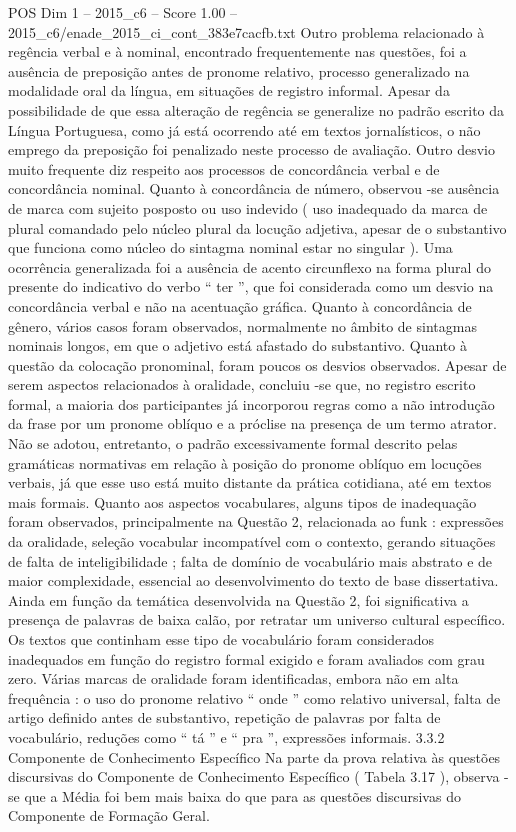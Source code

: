 \begin{textsample}{POS Dim 1 – 2015\_c6 – Score 1.00 – 2015\_c6/enade\_2015\_ci\_cont\_383e7cacfb.txt}
Outro problema relacionado à regência verbal e à nominal, encontrado frequentemente nas questões, foi a ausência de preposição antes de pronome relativo, processo generalizado na modalidade oral da língua, em situações de registro informal.
Apesar da possibilidade de que essa alteração de regência se generalize no padrão escrito da Língua Portuguesa, como já está ocorrendo até em textos jornalísticos, o não emprego da preposição foi penalizado neste processo de avaliação.
Outro desvio muito frequente diz respeito aos processos de concordância verbal e de concordância nominal.
Quanto à concordância de número, observou -se ausência de marca com sujeito posposto ou uso indevido ( uso inadequado da marca de plural comandado pelo núcleo plural da locução adjetiva, apesar de o substantivo que funciona como núcleo do sintagma nominal estar no singular ).
Uma ocorrência generalizada foi a ausência de acento circunflexo na forma plural do presente do indicativo do verbo “ ter ”, que foi considerada como um desvio na concordância verbal e não na acentuação gráfica.
Quanto à concordância de gênero, vários casos foram observados, normalmente no âmbito de sintagmas nominais longos, em que o adjetivo está afastado do substantivo.
Quanto à questão da colocação pronominal, foram poucos os desvios observados.
Apesar de serem aspectos relacionados à oralidade, concluiu -se que, no registro escrito formal, a maioria dos participantes já incorporou regras como a não introdução da frase por um pronome oblíquo e a próclise na presença de um termo atrator.
Não se adotou, entretanto, o padrão excessivamente formal descrito pelas gramáticas normativas em relação à posição do pronome oblíquo em locuções verbais, já que esse uso está muito distante da prática cotidiana, até em textos mais formais.
Quanto aos aspectos vocabulares, alguns tipos de inadequação foram observados, principalmente na Questão 2, relacionada ao funk : expressões da oralidade, seleção vocabular incompatível com o contexto, gerando situações de falta de inteligibilidade ; falta de domínio de vocabulário mais abstrato e de maior complexidade, essencial ao desenvolvimento do texto de base dissertativa.
Ainda em função da temática desenvolvida na Questão 2, foi significativa a presença de palavras de baixa calão, por retratar um universo cultural específico.
Os textos que continham esse tipo de vocabulário foram considerados inadequados em função do registro formal exigido e foram avaliados com grau zero.
Várias marcas de oralidade foram identificadas, embora não em alta frequência : o uso do pronome relativo “ onde ” como relativo universal, falta de artigo definido antes de substantivo, repetição de palavras por falta de vocabulário, reduções como “ tá ” e “ pra ”, expressões informais. 3.3.2 Componente de Conhecimento Específico Na parte da prova relativa às questões discursivas do Componente de Conhecimento Específico ( Tabela 3.17 ), observa -se que a Média foi bem mais baixa do que para as questões discursivas do Componente de Formação Geral.

\end{textsample}
